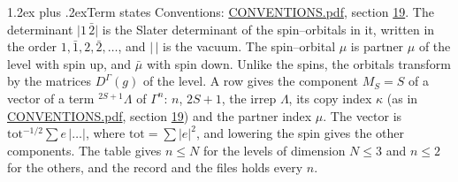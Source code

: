 \documentclass[10pt,a4paper]{article}
\makeatletter
\renewcommand\section{\@startsection{section}{1}{\z@}{-3ex plus -1ex minus -.2ex}%
  {1.2ex plus .2ex}{\normalfont\large\sffamily\bfseries\color{parttitle}}}
\numberwithin{equation}{section}
\newcommand{\repD}[1]{D^{#1}}
\newcommand{\mult}{\kappa}
\newcommand{\intx}{\mu}
\newcommand{\term}[2]{{}^{#1}#2}
\newcommand{\sdet}[1]{\lvert #1\rvert}
\makeatother
\begin{document}
\section{Term states}\label{s:term_states}
Conventions: \href{../../CONVENTIONS.pdf}{CONVENTIONS.pdf}, section \href{../../CONVENTIONS.pdf\#conv.19}{19}.
\leavevmode\label{n:vector.determinant}\label{n:index.spin.down}\label{n:local.spin.projection}The determinant $\sdet{1\,\bar{2}}$ is the Slater determinant of the spin--orbitals in it, written in the order $1, \bar{1}, 2, \bar{2}, \dots$, and $\sdet{\,}$ is the vacuum. The spin--orbital $\intx$ is partner $\intx$ of the level with spin up, and $\bar{\intx}$ with spin down. Unlike the spins, the orbitals transform by the matrices $\repD{\Gamma}(g)$ of the level. A row gives the component $M_S = S$ of a vector of a term $\term{2S+1}{\Lambda}$ of $\Gamma^{n}$: $n$, $2S + 1$, the irrep $\Lambda$, its copy index $\mult$ (as in \href{../../CONVENTIONS.pdf}{CONVENTIONS.pdf}, section \href{../../CONVENTIONS.pdf\#conv.19}{19}) and the partner index $\intx$. The vector is $\mathrm{tot}^{-1/2}\sum e\,\sdet{\dots}$, where $\mathrm{tot} = \sum |e|^2$, and lowering the spin gives the other components. The table gives $n \le N$ for the levels of dimension $N \le 3$ and $n \le 2$ for the others, and the record and the files holds every $n$.
\end{document}
